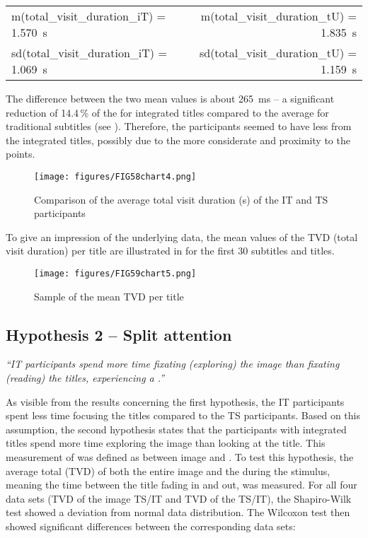 \begin{tabular}[t]{lr} 
m(total\_visit\_duration\_iT) = 1.570~s & m(total\_visit\_duration\_tU) = 1.835~s\\
sd(total\_visit\_duration\_iT) = 1.069~s & sd(total\_visit\_duration\_tU) = 1.159~s\\
\end{tabular}

\bigskip
The difference between the two mean values is about 265~ms – a significant reduction of 14.4\,\% of the  for integrated titles compared to the average  for traditional subtitles (see ). Therefore, the participants seemed to have less  from the integrated titles, possibly due to the more considerate  and proximity to the  points.


\begin{figure}
\texttt{[image: figures/FIG58chart4.png]}
\caption{Comparison of the average total visit duration (s) of the IT and TS participants}
\label{fig:FIG58chart4}
\end{figure}

To give an impression of the underlying data, the mean values of the TVD (total visit duration) per title are illustrated in  for the first 30 subtitles and titles.

\begin{figure}
\texttt{[image: figures/FIG59chart5.png]}
\caption{Sample of the mean TVD per title}
\label{fig:FIG59chart5}
\end{figure}

\subsection{Hypothesis 2 – Split attention}\label{sec:8.1.2}

\textit{“IT participants spend more time fixating (exploring) the image than fixating (reading) the titles, experiencing a .”}
\bigskip

As visible from the results concerning the first hypothesis, the IT participants spent less time focusing the titles compared to the TS participants. Based on this assumption, the second hypothesis states that the participants with integrated titles spend more time exploring the image than looking at the title. This measurement of  was defined as  between image and . To test this hypothesis, the average total  (TVD) of both the entire image and the  during the stimulus, meaning the time between the title fading in and out, was measured. For all four data sets (TVD of the image TS/IT and TVD of the  TS/IT), the Shapiro-Wilk test showed a deviation from normal data distribution. The Wilcoxon test then showed significant differences between the corresponding data sets:
\bigskip

